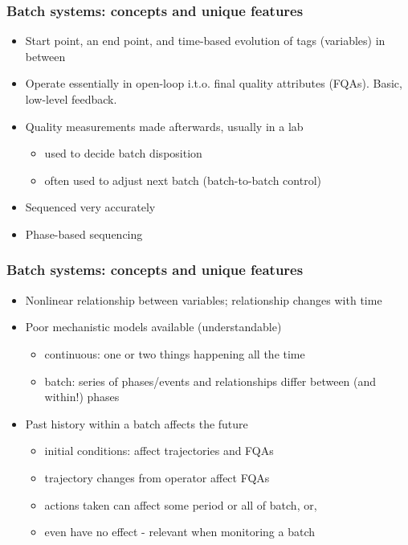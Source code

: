 \begin{frame}\frametitle{Batch systems: concepts and unique features}

\begin{itemize}
	\item 	Start point, an end point, and time-based evolution of tags (variables) in between 
	
	\item 	Operate essentially in open-loop i.t.o. final quality attributes (FQAs).  Basic, low-level feedback. \pause
	
	\item 	Quality measurements made afterwards, usually in a lab
	
			\begin{itemize}
				\item	used to decide batch disposition
				\item	often used to adjust next batch (batch-to-batch control)
			\end{itemize}\pause
			
	\item	Sequenced very accurately
	
	\item	Phase-based sequencing

\end{itemize}
\end{frame}

\begin{frame}\frametitle{Batch systems: concepts and unique features}

\begin{itemize}
	
	\item	Nonlinear relationship between variables; relationship changes with time \pause
	
	\item	Poor mechanistic models available (understandable)
	
			\begin{itemize}
				\item	continuous: one or two things happening all the time
				\item	batch: series of phases/events and relationships differ between (and within!) phases
			\end{itemize} \pause
			
	\item 	Past history within a batch affects the future
	
			\begin{itemize}
				\item	initial conditions: affect trajectories and FQAs								
				\item	trajectory changes from operator affect FQAs
				\item	actions taken can affect some period or all of batch, or,
				\item	even have no effect - relevant when monitoring a batch
			\end{itemize}
\end{itemize}
\end{frame}

